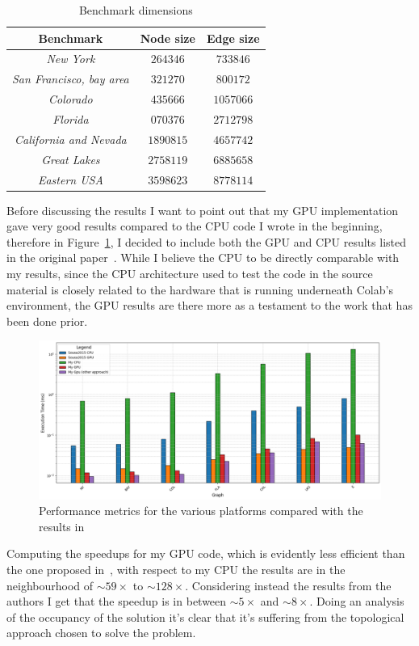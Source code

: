 \documentclass[a4paper,10pt]{article}
\begin{document}
\begin{longtable}{|c|c|c|}
	\caption{Benchmark dimensions}\label{tbl:benchmarks}
	\\\hline\textbf{Benchmark} & \textbf{Node size} & \textbf{Edge size} \\\hline\hline
	\endfirsthead\hline\endlastfoot

	\textit{New York}                & $\num{264346}$   & $\num{733846}$  \\\hline
	\textit{San Francisco, bay area} & $\num{321270}$   & $\num{800172}$  \\\hline
	\textit{Colorado}                & $\num{435666}$   & $\num{1057066}$ \\\hline
	\textit{Florida}                 & $\num{ 070376}$  & $\num{2712798}$ \\\hline
	\textit{California and Nevada}   & $\num{ 1890815}$ & $\num{4657742}$ \\\hline
	\textit{Great Lakes}             & $\num{2758119}$  & $\num{6885658}$ \\\hline
	\textit{Eastern USA}             & $\num{3598623}$  & $\num{8778114}$
\end{longtable}
Before discussing the results I want to point out that my GPU implementation gave very good results compared to the CPU code I wrote in the beginning, therefore in Figure~\ref{fig:results}, I decided to include both the GPU and CPU results listed in the original paper~\cite{generic-he-boruvka}. While I believe the CPU to be directly comparable with my results, since the CPU architecture used to test the code in the source material is closely related to the hardware that is running underneath Colab's environment, the GPU results are there more as a testament to the work that has been done prior.
\begin{figure}
	\centering
	\includegraphics[scale=0.4]{fig/benchmarks.png}
	\caption{Performance metrics for the various platforms compared with the results in \cite{generic-he-boruvka}}
	\label{fig:results}
\end{figure}
Computing the speedups for my GPU code, which is evidently less efficient than the one proposed in~\cite{generic-he-boruvka}, with respect to my CPU the results are in the neighbourhood of $\sim59\times$ to $\sim128\times$. Considering instead the results from the authors I get that the speedup is in between $\sim5\times$ and $\sim8\times$. Doing an analysis of the occupancy of the solution it's clear that it's suffering from the topological approach chosen to solve the problem.
\end{document}
